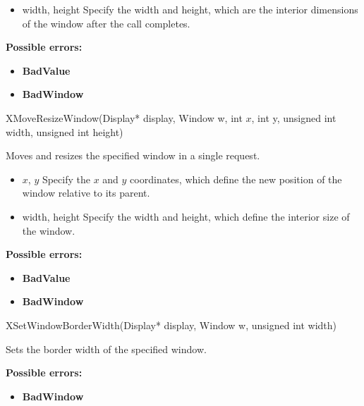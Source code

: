 \documentclass{report}
\begin{document}
\begin{itemize}
            \begin{itemize}
                \item width, height Specify the width and height, which are the interior dimensions of the window after the call completes.
            \end{itemize}

            \bigbreak \noindent
            \textbf{Possible errors:}
            \begin{itemize}
                \item \textbf{BadValue}
                \item \textbf{BadWindow}
            \end{itemize}

            \begin{cppcode}
                XMoveResizeWindow(Display* display, Window w, int $x$, int y, unsigned int width, unsigned int height)
            \end{cppcode}
            \bigbreak \noindent
            Moves and resizes the specified window in a single request.

            \begin{itemize}
                \item $x$, $y$ Specify the $x$ and $y$ coordinates, which define the new position of the window relative to its parent.
                \item width, height Specify the width and height, which define the interior size of the window.
            \end{itemize}

            \bigbreak \noindent
            \textbf{Possible errors:}
            \begin{itemize}
                \item \textbf{BadValue}
                \item \textbf{BadWindow}
            \end{itemize}

            \begin{cppcode}
                XSetWindowBorderWidth(Display* display, Window w, unsigned int width)
            \end{cppcode}
            \bigbreak \noindent
            Sets the border width of the specified window.

            \bigbreak \noindent
            \textbf{Possible errors:}
            \begin{itemize}
                \item \textbf{BadWindow}
            \end{itemize}


\end{itemize}
\end{document}
